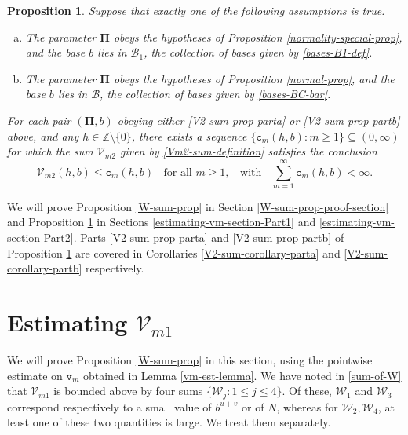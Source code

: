 \documentclass[12pt, twoside]{article}
\def\red{\color{red}}
\newtheorem{proposition}[theorem]{Proposition}
\theoremstyle{definition}
\numberwithin{equation}{section}
\begin{document}
\begin{proposition} \label{V2-sum-prop}
Suppose that exactly one of the following assumptions is true. 
\begin{enumerate}[(a)] 
\item The parameter $\pmb{\Pi}$ obeys the hypotheses of Proposition \ref{normality-special-prop}, and  
the base $b$ lies in $\mathscr{B}_1$, the collection of bases given by \eqref{bases-B1-def}. \label{V2-sum-prop-parta}
\item  The parameter $\pmb{\Pi}$ obeys the hypotheses of Proposition \ref{normal-prop}, 
and the base $b$ lies in $\mathscr{B}$, the collection of bases given by \eqref{bases-BC-bar}. \label{V2-sum-prop-partb}
\end{enumerate} 
For each pair $(\pmb{\Pi}, b)$ obeying either \eqref{V2-sum-prop-parta} or \eqref{V2-sum-prop-partb} above, and any $h \in \mathbb Z \setminus \{0\}$, there exists a sequence $\{\mathtt c_m(h, b) : m \geq 1\} \subseteq (0, \infty)$ for which the sum $\mathcal V_{m2}$ given by \eqref{Vm2-sum-definition} satisfies the conclusion
\begin{equation} \label{V2-sum-estimate}
\mathcal V_{m2}(h, b) \leq \mathtt c_m(h, b) \; \; \text{ for all } m \geq 1, \; \; \text{ with } \; \; \sum_{m=1}^{\infty} \mathtt c_m(h, b) < \infty.  
\end{equation}   
\end{proposition} 
\noindent We will prove Proposition \ref{W-sum-prop} in Section \ref{W-sum-prop-proof-section} and Proposition \ref{V2-sum-prop} in Sections \ref{estimating-vm-section-Part1} and \ref{estimating-vm-section-Part2}. Parts \eqref{V2-sum-prop-parta} and \eqref{V2-sum-prop-partb} of Proposition \ref{V2-sum-prop} are covered in Corollaries \ref{V2-sum-corollary-parta} and \ref{V2-sum-corollary-partb} respectively.   

\section{Estimating $\mathcal{V}_{m1}$} \label{estimating-Vm1-section} 
We will prove Proposition \ref{W-sum-prop} in this section, using the pointwise estimate on $\mathtt v_m$ obtained in Lemma \ref{vm-est-lemma}. We have noted in \eqref{sum-of-W} that $\mathcal V_{m1}$ is bounded above by four sums $\{\mathcal W_j: 1 \leq j \leq 4\}$. Of these, $\mathcal W_1$ and $\mathcal W_3$ correspond respectively to a small value of $b^{u+v}$ or of $N$, whereas for $\mathcal W_2, \mathcal W_4$, at least one of these two quantities is large. We treat them separately.  
\end{document}
